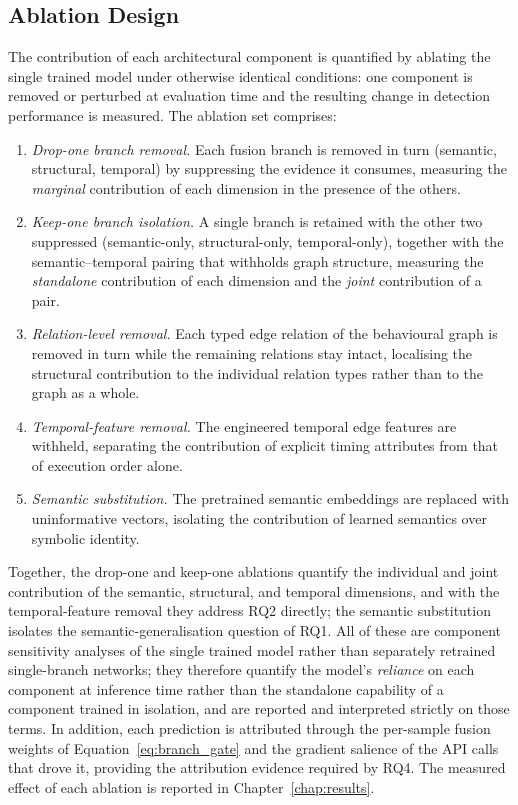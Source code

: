 \documentclass[%
    BCOR=10mm,
    DIV=13,
    toc=bibliography,
    toc=listof,
    oneside,
    12pt,
]{scrbook}
\begin{document}
\subsection{Ablation Design}
\label{subsec:ablations}

The contribution of each architectural component is quantified by ablating the
single trained model under otherwise identical conditions: one component is
removed or perturbed at evaluation time and the resulting change in detection
performance is measured. The ablation set comprises:
\begin{enumerate}[leftmargin=*]
  \item \emph{Drop-one branch removal.} Each fusion branch is removed in turn
        (semantic, structural, temporal) by suppressing the evidence it
        consumes, measuring the \emph{marginal} contribution of
        each dimension in the presence of the others.
  \item \emph{Keep-one branch isolation.} A single branch is retained with the
        other two suppressed (se\-mantic-only, struc\-tural-only,
        tem\-poral-only), together with the se\-mantic--temporal pairing that
        withholds graph
        structure, measuring the \emph{standalone} contribution of each
        dimension and the \emph{joint} contribution of a pair.
  \item \emph{Relation-level removal.} Each typed edge relation of the
        behavioural graph is removed in turn while the remaining relations
        stay intact, localising the structural contribution to the
        individual relation types rather than to the graph as a whole.
  \item \emph{Temporal-feature removal.} The engineered temporal edge features
        are withheld, separating the contribution of explicit timing
        attributes from that of execution order alone.
  \item \emph{Semantic substitution.} The pretrained semantic embeddings are
        replaced with uninformative vectors, isolating the contribution of
        learned semantics over symbolic identity.
\end{enumerate}
Together, the drop-one and keep-one ablations quantify the individual and joint
contribution of the semantic, structural, and temporal dimensions, and with the
temporal-feature removal they address RQ2 directly; the semantic substitution
isolates the semantic-generalisation question of RQ1. All of these are
component sensitivity analyses of the single trained model rather than
separately retrained single-branch networks; they therefore quantify the
model's \emph{reliance} on each component at inference time rather than the
standalone capability of a component trained in isolation, and are reported and
interpreted strictly on those terms. In addition, each prediction is
attributed through the per-sample fusion weights of
Equation~\ref{eq:branch_gate} and the gradient salience of the API calls that
drove it, providing the attribution evidence required by RQ4. The measured effect of each ablation is reported in
Chapter~\ref{chap:results}.
\end{document}
